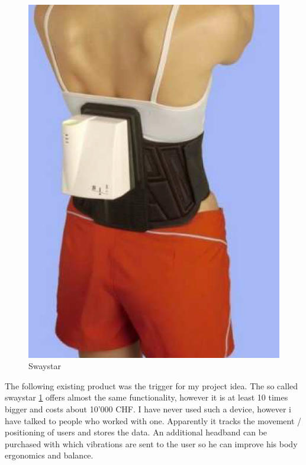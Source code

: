 \begin{figure}
 \vspace{-20pt}
  \begin{center}
\includegraphics[width=\linewidth]{images/Swaystar_01.png}
  \end{center}
  \caption{\label{fig:swaystar}Swaystar}
\end{figure}

The following existing product was the trigger for my project idea. The so called swaystar \ref{fig:swaystar} offers almost the same functionality, however it is at least 10 times bigger and costs about 10'000 CHF. 
I have never used such a device, however i have talked to people who worked with one. Apparently it tracks the movement / positioning of users and stores the data. An additional headband can be purchased with which vibrations are sent to the user so he can improve his body ergonomics and balance. 

